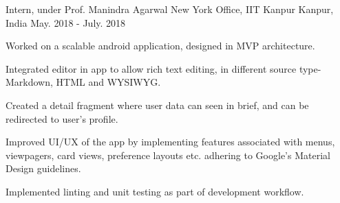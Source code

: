 \begin{cventries}
  \cventry
  {Intern, under Prof. Manindra Agarwal}
  {New York Office, IIT Kanpur}
  {Kanpur, India}
  {May. 2018 - July. 2018}
  {
    \begin{cvitems}
          \item {Worked on a scalable android application, designed in MVP architecture.}
          \item {Integrated editor in app to allow rich text editing, in different source type- Markdown, HTML and WYSIWYG.}
          \item {Created a detail fragment where user data can seen in brief, and can be redirected to user’s profile.}
          \item {Improved UI/UX of the app by implementing features associated with menus, viewpagers, card views, preference layouts etc. adhering to Google’s Material Design guidelines.}
          \item{Implemented linting and unit testing as part of development workflow.}
    \end{cvitems}
  }

\end{cventries}